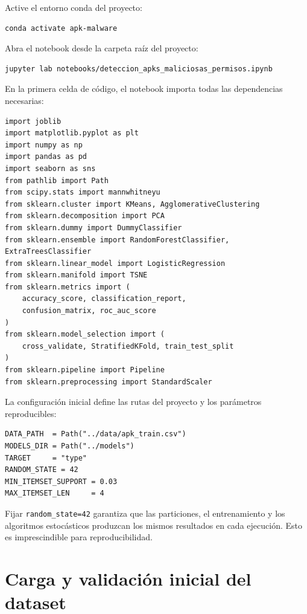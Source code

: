 \documentclass[
  coursetitle={Cómputo Nube y Tecnologías Emergentes},
  coursehours={96},
  coursedate={Verano 2026},
  doctype={Tutorial},
  otherlangs={english,french},
  authorname={Lázaro},
  authorsurname={Bustio-Martínez},
  authortitle={PhD},
  role={Profesor Investigador},
  email={lbustio@inaoe.mx},
  phone={5559504000},
  ext={7459},
  institution={Instituto Nacional de Astrofísica, Óptica y Electrónica (INAOE)},
  department={Maestría en Ciencias en Tecnologías de Seguridad},
  address={Luis Enrique Erro 1, Sta. Ma. Tonantzintla, San Andrés Cholula, CP 72840, Puebla, México},
  margin={0.5in}
]{../../lbustio_lecture_notes}
\begin{document}
Active el entorno conda del proyecto:

\begin{lstlisting}
conda activate apk-malware
\end{lstlisting}

Abra el notebook desde la carpeta raíz del proyecto:

\begin{lstlisting}
jupyter lab notebooks/deteccion_apks_maliciosas_permisos.ipynb
\end{lstlisting}

En la primera celda de código, el notebook importa todas las dependencias necesarias:

\begin{lstlisting}
import joblib
import matplotlib.pyplot as plt
import numpy as np
import pandas as pd
import seaborn as sns
from pathlib import Path
from scipy.stats import mannwhitneyu
from sklearn.cluster import KMeans, AgglomerativeClustering
from sklearn.decomposition import PCA
from sklearn.dummy import DummyClassifier
from sklearn.ensemble import RandomForestClassifier, ExtraTreesClassifier
from sklearn.linear_model import LogisticRegression
from sklearn.manifold import TSNE
from sklearn.metrics import (
    accuracy_score, classification_report,
    confusion_matrix, roc_auc_score
)
from sklearn.model_selection import (
    cross_validate, StratifiedKFold, train_test_split
)
from sklearn.pipeline import Pipeline
from sklearn.preprocessing import StandardScaler
\end{lstlisting}

La configuración inicial define las rutas del proyecto y los parámetros reproducibles:

\begin{lstlisting}
DATA_PATH  = Path("../data/apk_train.csv")
MODELS_DIR = Path("../models")
TARGET     = "type"
RANDOM_STATE = 42
MIN_ITEMSET_SUPPORT = 0.03
MAX_ITEMSET_LEN     = 4
\end{lstlisting}

\begin{tcolorbox}[title=Semilla aleatoria]
Fijar \texttt{random\_state=42} garantiza que las particiones, el entrenamiento y los algoritmos estocásticos produzcan los mismos resultados en cada ejecución. Esto es imprescindible para reproducibilidad.
\end{tcolorbox}

\section{Carga y validación inicial del dataset}
\end{document}
